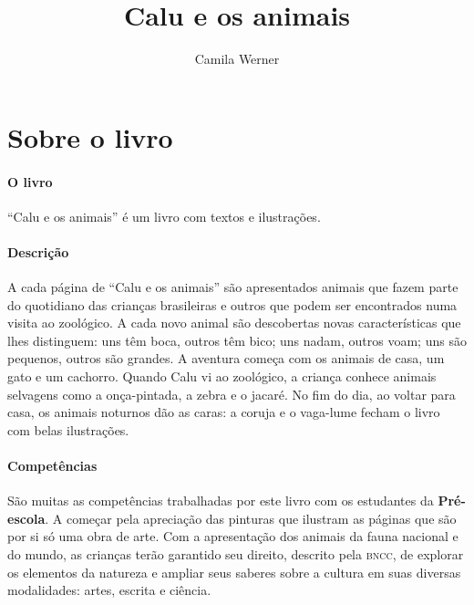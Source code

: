 \documentclass[11pt]{extarticle}
\newcommand{\AutorLivro}{Camila Werner}
\newcommand{\TituloLivro}{Calu e os animais}
\newcommand{\colaborador}{{Paulo Pompermaier e Renier Silva}}
\begin{document}
\title{\TituloLivro}
\author{\AutorLivro}
\def\authornotes{\colaborador}

\date{}
\maketitle


\tableofcontents



\section{Sobre o livro}

\paragraph{O livro} 
``Calu e os animais'' é um livro com textos e ilustrações.
\paragraph{Descrição} 
A cada página de ``Calu e os animais'' são apresentados animais
que fazem parte do quotidiano das crianças brasileiras e outros
que podem ser encontrados numa visita ao zoológico. 
A cada novo animal são descobertas novas características que lhes
distinguem: uns têm boca, outros têm bico; uns nadam, outros voam;
uns são pequenos, outros são grandes. 
A aventura começa com os animais de casa, um gato e um cachorro.
Quando Calu vi ao zoológico, a criança conhece animais selvagens
como a onça-pintada, a zebra e o jacaré. 
No fim do dia, ao voltar para casa, os animais noturnos
dão as caras: a coruja e o vaga-lume fecham o livro com belas ilustrações.
\paragraph{Competências} 
São muitas as competências trabalhadas por este livro com os estudantes da \textbf{Pré-escola}.
A começar pela apreciação das pinturas que ilustram as páginas que são por si só uma
obra de arte. Com a apresentação dos animais da fauna nacional e do mundo, as crianças
terão garantido seu direito, descrito pela \textsc{bncc}, de explorar os elementos da natureza
e ampliar seus saberes sobre a cultura em suas diversas modalidades: artes, escrita e ciência.
\end{document}
